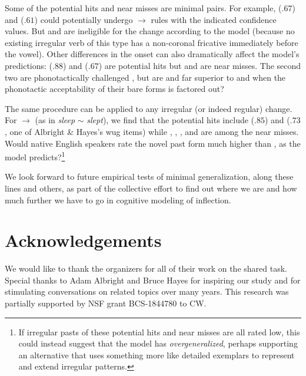 \documentclass[11pt]{article}
\begin{document}
Some of the potential hits and near misses are minimal pairs. For example,  ($.67$) and  ($.61$) could potentially undergo  $\to$  rules with the indicated confidence values. But  and  are ineligible for the change according to the model (because no existing irregular verb of this type has a non-coronal fricative immediately before the vowel). Other differences in the onset can also dramatically affect the model's predictions:  ($.88$) and  ($.67$) are potential hits but  and  are near misses. The second two are phonotactically challenged \citep{davis-1989-cross}, but are  and  far superior to  and  when the phonotactic acceptability of their bare forms is factored out?

The same procedure can be applied to any irregular (or indeed regular) change. For  $\to$  (as in \emph{sleep} $\sim$ \emph{slept}), we find that the potential hits include  ($.85$) and  ($.73$, one of Albright \& Hayes's wug items) while , , , and  are among the near misses. Would native English speakers rate the novel past form  much higher than , as the model predicts?\footnote{If irregular pasts of these potential hits and near misses are all rated low, this could instead suggest that the model has \emph{overgeneralized}, perhaps supporting an alternative that uses something more like detailed exemplars to represent and extend irregular patterns.}

We look forward to future empirical tests of minimal generalization, along these lines and others, as part of the collective effort to find out where we are and how much further we have to go in cognitive modeling of inflection.


\section*{Acknowledgements}

We would like to thank the organizers for all of their work on the shared task. Special thanks to Adam Albright and Bruce Hayes for inspiring our study and for stimulating conversations on related topics over many years. This research was partially supported by NSF grant BCS-1844780 to CW.






\appendix


\end{document}
